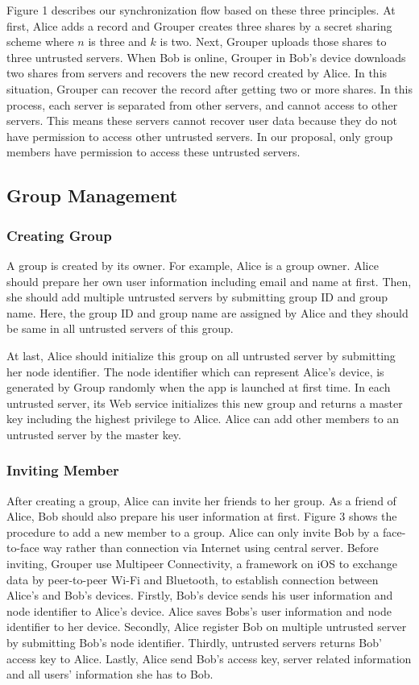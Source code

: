 \documentclass[twocolumn,10pt]{article}
\begin{document}
Figure 1 describes our synchronization flow based on these three principles. At first, Alice adds a record and Grouper creates three shares by a secret sharing scheme where $n$ is three and $k$ is two. Next, Grouper uploads those shares to three untrusted servers. When Bob is online, Grouper in Bob's device downloads two shares from servers and recovers the new record created by Alice. In this situation, Grouper can recover the record after getting two or more shares. In this process, each server is separated from other servers, and cannot access to other servers. This means these servers cannot recover user data because they do not have permission to access other untrusted servers. In our proposal, only group members have permission to access these untrusted servers.

\subsection{Group Management}

\subsubsection{Creating Group}

A group is created by its owner. For example, Alice is a group owner. Alice should prepare her own user information including email and name at first. Then, she should add multiple untrusted servers by submitting group ID and group name. Here, the group ID and group name are assigned by Alice and they should be same in all untrusted servers of this group. 

At last, Alice should initialize this group on all untrusted server by submitting her node identifier. The node identifier which can represent Alice's device, is generated by Group randomly when the app is launched at first time.  In each untrusted server, its Web service initializes this new group and returns a master key including the highest privilege to Alice. Alice can add other members to an untrusted server by the master key.

\subsubsection{Inviting Member}

After creating a group, Alice can invite her friends to her group. As a friend of Alice, Bob should also prepare his user information at first. Figure 3 shows the procedure to add a new member to a group. Alice can only invite Bob by a face-to-face way rather than connection via Internet using central server. Before inviting, Grouper use Multipeer Connectivity, a framework on iOS to exchange data by peer-to-peer Wi-Fi and Bluetooth, to establish connection between Alice's and Bob's devices. Firstly, Bob's device sends his user information and node identifier to Alice's device. Alice saves Bobs's user information and node identifier to her device. Secondly, Alice register Bob on multiple untrusted server by submitting Bob's node identifier. Thirdly, untrusted servers returns Bob' access key to Alice. Lastly, Alice send Bob's access key, server related information and all users' information she has to Bob.
\end{document}

